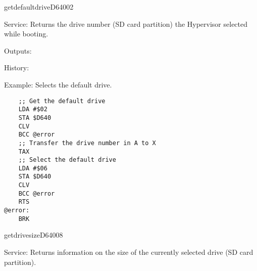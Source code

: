 \newpage
\begin{hyppotrap}{getdefaultdrive}{D640}{02}
\item [Service:]
  Returns the drive number (SD card partition) the Hypervisor selected while
  booting.
\item [Outputs:]
\item [History:]
\item [Example:]
  Selects the default drive.
\begin{tcolorbox}[colback=black,coltext=white]
\verbatimfont{\codefont}
\begin{verbatim}
    ;; Get the default drive
    LDA #$02
    STA $D640
    CLV
    BCC @error
    ;; Transfer the drive number in A to X
    TAX
    ;; Select the default drive
    LDA #$06
    STA $D640
    CLV
    BCC @error
    RTS
@error:
    BRK
\end{verbatim}
\end{tcolorbox}
\end{hyppotrap}


\newpage
\begin{hyppotrap}{getdrivesize}{D640}{08}
\item [Service:]
  Returns information on the size of the currently selected drive (SD card
  partition).
\notimplemented
\end{hyppotrap}


